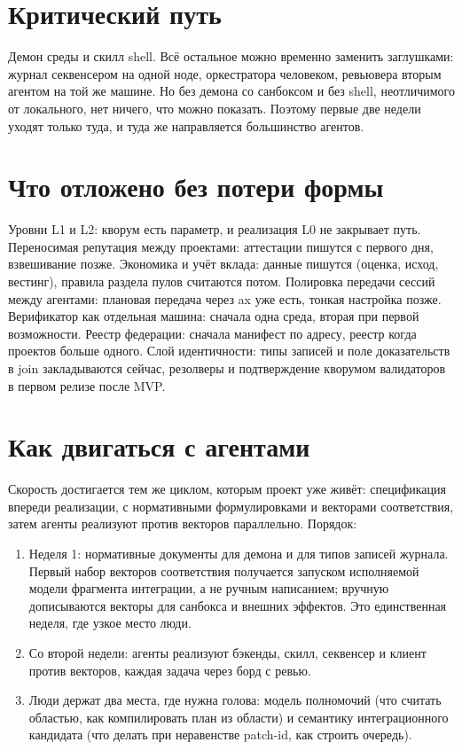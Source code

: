 \section{Критический путь}

Демон среды и скилл shell. Всё остальное можно временно заменить заглушками: журнал секвенсером на одной ноде, оркестратора человеком, ревьювера вторым агентом на той же машине. Но без демона со санбоксом и без shell, неотличимого от локального, нет ничего, что можно показать. Поэтому первые две недели уходят только туда, и туда же направляется большинство агентов.

\section{Что отложено без потери формы}

Уровни L1 и L2: кворум есть параметр, и реализация L0 не закрывает путь. Переносимая репутация между проектами: аттестации пишутся с первого дня, взвешивание позже. Экономика и учёт вклада: данные пишутся (оценка, исход, вестинг), правила раздела пулов считаются потом. Полировка передачи сессий между агентами: плановая передача через ax уже есть, тонкая настройка позже. Верификатор как отдельная машина: сначала одна среда, вторая при первой возможности. Реестр федерации: сначала манифест по адресу, реестр когда проектов больше одного. Слой идентичности: типы записей и поле доказательств в join закладываются сейчас, резолверы и подтверждение кворумом валидаторов в первом релизе после MVP.

\section{Как двигаться с агентами}

Скорость достигается тем же циклом, которым проект уже живёт: спецификация впереди реализации, с нормативными формулировками и векторами соответствия, затем агенты реализуют против векторов параллельно. Порядок:

\begin{enumerate}
\item Неделя 1: нормативные документы для демона и для типов записей журнала. Первый набор векторов соответствия получается запуском исполняемой модели фрагмента интеграции, а не ручным написанием; вручную дописываются векторы для санбокса и внешних эффектов. Это единственная неделя, где узкое место люди.
\item Со второй недели: агенты реализуют бэкенды, скилл, секвенсер и клиент против векторов, каждая задача через борд с ревью.
\item Люди держат два места, где нужна голова: модель полномочий (что считать областью, как компилировать план из области) и семантику интеграционного кандидата (что делать при неравенстве patch-id, как строить очередь).
\end{enumerate}


